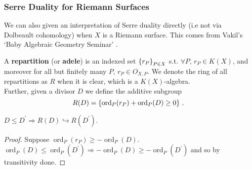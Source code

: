 \documentclass{article}
\begin{document}
\subsubsection{Serre Duality for Riemann Surfaces}
We can also given an interpretation of Serre duality directly (i.e not via Dolbeault cohomology) when $X$ is a Riemann surface. This comes from Vakil's `Baby Algebraic Geometry Seminar' \cite{Vakil2000}. 

\begin{definition}
	A \textbf{repartition} (or \textbf{adele}) is an indexed set $\left\{ r_P \right\}_{P \in X}$ s.t. $\forall P, \, r_P \in K(X)$, and moreover for all but finitely many $P, \, r_P \in O_{X,P}$. We denote the ring of all repartitions as $R$ when it is clear, which is a $K(X)$-algebra. \\
	Further, given a divisor $D$ we define the additive subgroup 
	\[
	R(D) = \left\{ \operatorname{ord}_P(r_P) + \operatorname{ord}_P(D) \geq 0 \right\} \, .
	\]
\end{definition}

\begin{prop}
	$D \leq D^\prime \Rightarrow R(D) \hookrightarrow R(D^\prime)$. 
\end{prop}
\begin{proof}
	Suppose $\operatorname{ord}_P(r_P) \geq -\operatorname{ord}_P(D)$. $\operatorname{ord}_P(D) \leq \operatorname{ord}_P(D^\prime) \Rightarrow -\operatorname{ord}_P(D) \geq -\operatorname{ord}_P(D^\prime)$ and so by transitivity done. 
\end{proof}
\end{document}
